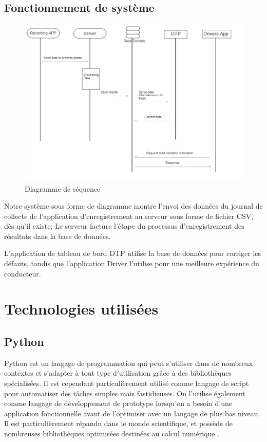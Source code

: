 \subsection{Fonctionnement de système}
\begin{figure}[ht]
    \center
    \includegraphics[width=1.2\textwidth]{Images/chapter3/diagrameSequence.jpg}
    \caption{Diagramme de séquence}
    \label{fig:System}
\end{figure}

Notre système sous forme de diagramme montre l'envoi des données du journal de collecte de l'application d'enregistrement au serveur sous forme de fichier CSV, dès qu'il existe; Le serveur facture l'étape du processus d'enregistrement des résultats dans la base de données.

L'application de tableau de bord DTP utilise la base de données pour corriger les défauts, tandis que l'application Driver l'utilise pour une meilleure expérience du conducteur.



\section{Technologies utilisées}
\subsection{Python}
Python \cite{WelcomePythonOrg} est un langage de programmation qui peut s'utiliser dans de nombreux contextes et s'adapter à tout type d'utilisation grâce à des bibliothèques spécialisées. Il est cependant particulièrement utilisé comme langage de script pour automatiser des tâches simples mais fastidieuses. On l'utilise également comme langage de développement de prototype lorsqu'on a besoin d'une application fonctionnelle avant de l'optimiser avec un langage de plus bas niveau. Il est particulièrement répandu dans le monde scientifique, et possède de nombreuses bibliothèques optimisées destinées au calcul numérique \cite{PythonLangageWikipedia}.
\renewcommand{\labelitemi}{$\bullet$}

